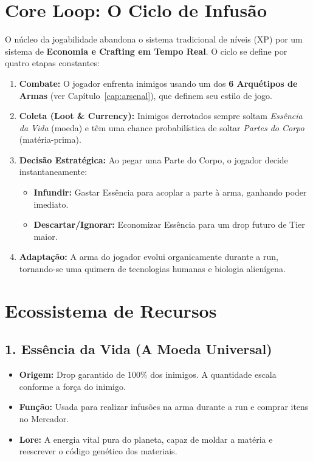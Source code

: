 \documentclass[a4paper,12pt]{report}
\begin{document}
\section{Core Loop: O Ciclo de Infusão}
O núcleo da jogabilidade abandona o sistema tradicional de níveis (XP) por um sistema de \textbf{Economia e Crafting em Tempo Real}. O ciclo se define por quatro etapas constantes:

\begin{enumerate}
    \item \textbf{Combate:} O jogador enfrenta inimigos usando um dos \textbf{6 Arquétipos de Armas} (ver Capítulo~\ref{cap:arsenal}), que definem seu estilo de jogo.
    \item \textbf{Coleta (Loot \& Currency):} Inimigos derrotados sempre soltam \textit{Essência da Vida} (moeda) e têm uma chance probabilística de soltar \textit{Partes do Corpo} (matéria-prima).
    \item \textbf{Decisão Estratégica:} Ao pegar uma Parte do Corpo, o jogador decide instantaneamente:
    \begin{itemize}
        \item \textbf{Infundir:} Gastar Essência para acoplar a parte à arma, ganhando poder imediato.
        \item \textbf{Descartar/Ignorar:} Economizar Essência para um drop futuro de Tier maior.
    \end{itemize}
    \item \textbf{Adaptação:} A arma do jogador evolui organicamente durante a run, tornando-se uma quimera de tecnologias humanas e biologia alienígena.
\end{enumerate}

\section{Ecossistema de Recursos}

\subsection{1. Essência da Vida (A Moeda Universal)}
\begin{itemize}
    \item \textbf{Origem:} Drop garantido de 100\% dos inimigos. A quantidade escala conforme a força do inimigo.
    \item \textbf{Função:} Usada para realizar infusões na arma durante a run e comprar itens no Mercador.
    \item \textbf{Lore:} A energia vital pura do planeta, capaz de moldar a matéria e reescrever o código genético dos materiais.
\end{itemize}
\end{document}
